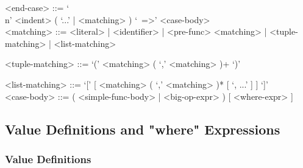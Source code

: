 \documentclass{article}
\begin{document}
\begin{itemize}
\begin{grammar}
<end-case> ::=
`\\n' <indent> ( `...' | <matching> ) `\ =>' <case-body>\\

<matching> ::= 
<literal> | <identifier> | <pre-func> <matching> | <tuple-matching> |
<list-matching>

<tuple-matching> ::= `(' <matching> ( `,' <matching> )+ `)'

<list-matching> ::= `[' [ <matching> ( `,' <matching> )* [ `, ...' ] ] `]' \\


<case-body> ::=
( <simple-func-body> | <big-op-expr> ) [ <where-expr> ]
\end{grammar}

\end{itemize}

\subsection{Value Definitions and  "where" Expressions}
\label{subsec:valdefswhere}

\subsubsection{Value Definitions}
\label{subsubsec:valdefs}
\end{document}
